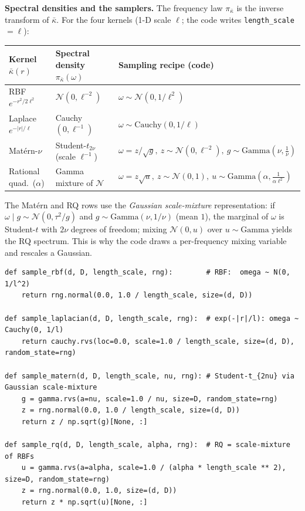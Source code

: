 \documentclass[11pt]{article}
\theoremstyle{plain}
\theoremstyle{definition}
\newcommand{\N}{\mathcal{N}}
\newcommand{\code}[1]{\texttt{#1}}
\begin{document}
\noindent\textbf{Spectral densities and the samplers.} The frequency law $\pi_{\bar\kappa}$ is the inverse transform of $\bar\kappa$. For the four kernels (1-D scale $\ell$; the code writes \code{length\_scale}$=\ell$):
\begin{center}
\renewcommand{\arraystretch}{1.35}
\begin{tabular}{lll}
\hline
Kernel $\bar\kappa(r)$ & Spectral density $\pi_{\bar\kappa}(\omega)$ & Sampling recipe (code)\\
\hline
RBF $e^{-r^2/2\ell^2}$ & $\N(0,\ell^{-2})$ & $\omega\sim\N(0,1/\ell^2)$\\
Laplace $e^{-|r|/\ell}$ & Cauchy$(0,\ell^{-1})$ & $\omega\sim\mathrm{Cauchy}(0,1/\ell)$\\
Mat\'ern-$\nu$ & Student-$t_{2\nu}$ (scale $\ell^{-1}$) & $\omega=z/\sqrt g,\ z\sim\N(0,\ell^{-2}),\ g\sim\mathrm{Gamma}(\nu,\tfrac1\nu)$\\
Rational quad.\ ($\alpha$) & Gamma mixture of $\N$ & $\omega=z\sqrt u,\ z\sim\N(0,1),\ u\sim\mathrm{Gamma}(\alpha,\tfrac{1}{\alpha\ell^2})$\\
\hline
\end{tabular}
\end{center}
The Mat\'ern and RQ rows use the \emph{Gaussian scale-mixture} representation: if $\omega\mid g\sim\N(0,\tau^2/g)$ and $g\sim\mathrm{Gamma}(\nu,1/\nu)$ (mean $1$), the marginal of $\omega$ is Student-$t$ with $2\nu$ degrees of freedom; mixing $\N(0,u)$ over $u\sim\mathrm{Gamma}$ yields the RQ spectrum. This is why the code draws a per-frequency mixing variable and rescales a Gaussian.
\begin{lstlisting}
def sample_rbf(d, D, length_scale, rng):        # RBF:  omega ~ N(0, 1/l^2)
    return rng.normal(0.0, 1.0 / length_scale, size=(d, D))

def sample_laplacian(d, D, length_scale, rng):  # exp(-|r|/l): omega ~ Cauchy(0, 1/l)
    return cauchy.rvs(loc=0.0, scale=1.0 / length_scale, size=(d, D), random_state=rng)

def sample_matern(d, D, length_scale, nu, rng): # Student-t_{2nu} via Gaussian scale-mixture
    g = gamma.rvs(a=nu, scale=1.0 / nu, size=D, random_state=rng)
    z = rng.normal(0.0, 1.0 / length_scale, size=(d, D))
    return z / np.sqrt(g)[None, :]

def sample_rq(d, D, length_scale, alpha, rng):  # RQ = scale-mixture of RBFs
    u = gamma.rvs(a=alpha, scale=1.0 / (alpha * length_scale ** 2), size=D, random_state=rng)
    z = rng.normal(0.0, 1.0, size=(d, D))
    return z * np.sqrt(u)[None, :]
\end{lstlisting}
\end{document}

